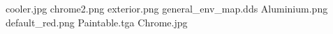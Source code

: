 cooler.jpg
chrome2.png
exterior.png
general_env_map.dds
Aluminium.png
default_red.png
Paintable.tga
Chrome.jpg
